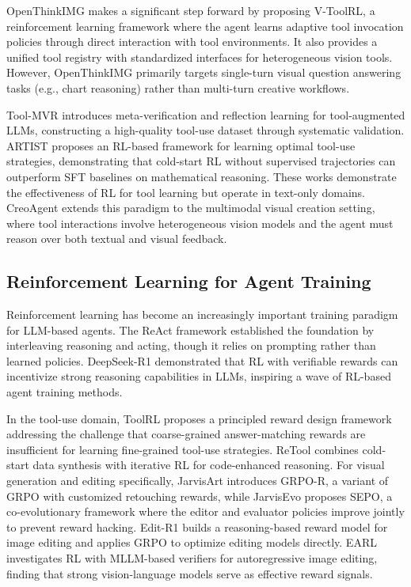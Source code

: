 \documentclass{article}
\begin{document}
OpenThinkIMG \cite{su2025openthinkimg} makes a significant step forward by proposing V-ToolRL, a reinforcement learning framework where the agent learns adaptive tool invocation policies through direct interaction with tool environments. It also provides a unified tool registry with standardized interfaces for heterogeneous vision tools. However, OpenThinkIMG primarily targets single-turn visual question answering tasks (e.g., chart reasoning) rather than multi-turn creative workflows.

Tool-MVR \cite{ma2025toolmvr} introduces meta-verification and reflection learning for tool-augmented LLMs, constructing a high-quality tool-use dataset through systematic validation. ARTIST \cite{artist2025} proposes an RL-based framework for learning optimal tool-use strategies, demonstrating that cold-start RL without supervised trajectories can outperform SFT baselines on mathematical reasoning. These works demonstrate the effectiveness of RL for tool learning but operate in text-only domains. CreoAgent extends this paradigm to the multimodal visual creation setting, where tool interactions involve heterogeneous vision models and the agent must reason over both textual and visual feedback.

\subsection{Reinforcement Learning for Agent Training}

Reinforcement learning has become an increasingly important training paradigm for LLM-based agents. The ReAct framework \cite{yao2022react} established the foundation by interleaving reasoning and acting, though it relies on prompting rather than learned policies. DeepSeek-R1 \cite{guo2025deepseekr1} demonstrated that RL with verifiable rewards can incentivize strong reasoning capabilities in LLMs, inspiring a wave of RL-based agent training methods.

In the tool-use domain, ToolRL \cite{toolrl2025} proposes a principled reward design framework addressing the challenge that coarse-grained answer-matching rewards are insufficient for learning fine-grained tool-use strategies. ReTool \cite{retool2025} combines cold-start data synthesis with iterative RL for code-enhanced reasoning. For visual generation and editing specifically, JarvisArt \cite{lin2025jarvisart} introduces GRPO-R, a variant of GRPO with customized retouching rewards, while JarvisEvo \cite{lin2025jarvisevo} proposes SEPO, a co-evolutionary framework where the editor and evaluator policies improve jointly to prevent reward hacking. Edit-R1 \cite{editr1} builds a reasoning-based reward model for image editing and applies GRPO to optimize editing models directly. EARL \cite{earl2025} investigates RL with MLLM-based verifiers for autoregressive image editing, finding that strong vision-language models serve as effective reward signals.
\end{document}
